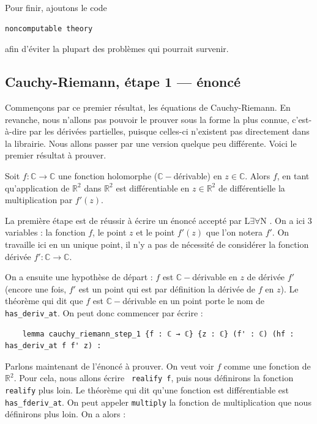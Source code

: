 \documentclass[a4paper, 11pt, twoside]{report}
\newcommand\R{\mathbb{R}}
\newcommand\C{\mathbb{C}}
\newcommand{\LEAN}{L$\exists\forall$N }
\begin{document}
Pour finir, ajoutons le code

\begin{lstlisting}
noncomputable theory 
\end{lstlisting}

afin d'éviter la plupart des problèmes qui pourrait survenir.

\subsection{Cauchy-Riemann, étape 1 --- énoncé}

Commençons par ce premier résultat, les équations de Cauchy-Riemann. En revanche, nous n'allons pas pouvoir le prouver sous la forme la plus connue, c'est-à-dire par les dérivées partielles, puisque celles-ci n'existent pas directement dans la librairie. Nous allons passer par une version quelque peu différente. Voici le premier résultat à prouver.

\begin{tcolorbox}[colback = red!10, colframe = red!80, title = Holomorphe $\Longrightarrow$ différentiable sur $\R^2$, fonttitle = \large\bfseries]
	Soit $f : \C\to \C$ une fonction holomorphe ($\C-$dérivable) en $z\in\C$. Alors $f$, en tant qu'application de $\R^2$ dans $\R^2$ est différentiable en $z\in\R^2$ de différentielle la multiplication par $f'(z)$.
\end{tcolorbox}

La première étape est de réussir à écrire un énoncé accepté par \LEAN. On a ici 3 variables : la fonction $f$, le point $z$ et le point $f'(z)$ que l'on notera $f'$. On travaille ici en un unique point, il n'y a pas de nécessité de considérer la fonction dérivée $f':\C\to \C$. 

On a ensuite une hypothèse de départ : $f$ est $\C-$dérivable en $z$ de dérivée $f'$ (encore une fois, $f'$ est un point qui est par définition la dérivée de $f$ en $z$). Le théorème qui dit que $f$ est $\C-$dérivable en un point porte le nom de \verb|has_deriv_at|. On peut donc commencer par écrire :

\begin{lstlisting}
	lemma cauchy_riemann_step_1 {f : ℂ → ℂ} {z : ℂ} (f' : ℂ) (hf : has_deriv_at f f' z) : 
\end{lstlisting}
	
	Parlons maintenant de l'énoncé à prouver. On veut voir $f$ comme une fonction de $\R^2$. Pour cela, nous allons écrire \verb| realify f|, puis nous définirons la fonction \verb|realify| plus loin. Le théorème qui dit qu'une fonction est différentiable est \verb|has_fderiv_at|. On peut appeler \verb|multiply| la fonction de multiplication que nous définirons plus loin. On a alors :
	
\end{document}
